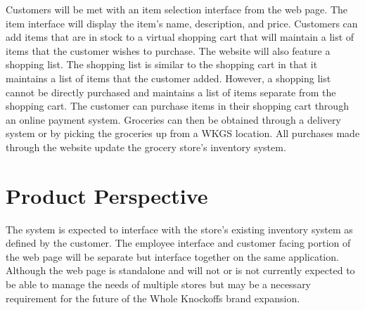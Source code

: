 \documentclass{scrreprt}
\theoremstyle{funreq}
\begin{document}
Customers will be met with an item selection interface from the web page.  The item interface will display the item's name, description, and price.  Customers can add items that are in stock to a virtual shopping cart that will maintain a list of items that the customer wishes to purchase.  The website will also feature a shopping list.  The shopping list is similar to the shopping cart in that it maintains a list of items that the customer added.  However, a shopping list cannot be directly purchased and maintains a list of items separate from the shopping cart.  The customer can purchase items in their shopping cart through an online payment system.  Groceries can then be obtained through a delivery system or by picking the groceries up from a WKGS location.  All purchases made through the website update the grocery store's inventory system.


\section{Product Perspective}
The system is expected to interface with the store's existing inventory system as defined by the customer. The employee interface and customer facing portion of the web page will be separate but interface together on the same application. Although the web page is standalone and will not or is not currently expected to be able to manage the needs of multiple stores but may be a necessary requirement for the future of the Whole Knockoffs brand expansion. %
\end{document}
